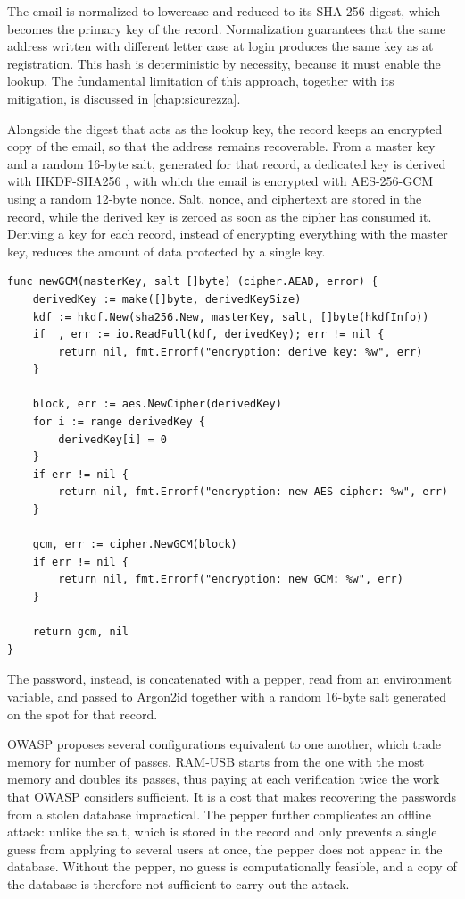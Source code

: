 The email is normalized to lowercase and reduced to its SHA-256 digest, which becomes the primary key
of the record. Normalization guarantees that the same address written with different letter case at login
produces the same key as at registration.
This hash is deterministic by necessity, because it must enable the lookup. The fundamental limitation of
this approach, together with its mitigation, is discussed in \autoref{chap:sicurezza}.

Alongside the digest that acts as the lookup key, the record keeps an encrypted copy of the email,
so that the address remains recoverable.
From a master key and a random 16-byte salt, generated for that record,
a dedicated key is derived with HKDF-SHA256 \cite{rfc5869}, with which the email is encrypted with
AES-256-GCM \cite{nist-sp-800-38d} using a random 12-byte nonce. Salt, nonce, and ciphertext
are stored in the record, while the derived key is zeroed as soon as the cipher has consumed it.
Deriving a key for each record, instead of encrypting everything with the master key, reduces the amount
of data protected by a single key.

\begin{lstlisting}[caption={Per-record key derivation in \texttt{newGCM}, from
\texttt{encryption.go} \cite{ramusb-code-hkdf-newgcm}.}, label={lst:hkdf}]
func newGCM(masterKey, salt []byte) (cipher.AEAD, error) {
	derivedKey := make([]byte, derivedKeySize)
	kdf := hkdf.New(sha256.New, masterKey, salt, []byte(hkdfInfo))
	if _, err := io.ReadFull(kdf, derivedKey); err != nil {
		return nil, fmt.Errorf("encryption: derive key: %w", err)
	}

	block, err := aes.NewCipher(derivedKey)
	for i := range derivedKey {
		derivedKey[i] = 0
	}
	if err != nil {
		return nil, fmt.Errorf("encryption: new AES cipher: %w", err)
	}

	gcm, err := cipher.NewGCM(block)
	if err != nil {
		return nil, fmt.Errorf("encryption: new GCM: %w", err)
	}

	return gcm, nil
}
\end{lstlisting}


The password, instead, is concatenated with a pepper, read from an environment variable, and passed to Argon2id
\cite{rfc9106} together with a random 16-byte salt generated on the spot for that record.

OWASP \cite{owasp-password-storage} proposes several configurations equivalent to one another, which
trade memory for number of passes. RAM-USB starts from the one with the most memory and doubles its
passes, thus paying at each verification twice the work that OWASP considers sufficient. It is a
cost that makes recovering the passwords from a stolen database impractical. The pepper further complicates
an offline attack: unlike the salt, which is stored in the record and only prevents
a single guess from applying to several users at once, the pepper does not appear in the database. Without the pepper,
no guess is computationally feasible, and a copy of the database is therefore not
sufficient to carry out the attack.

